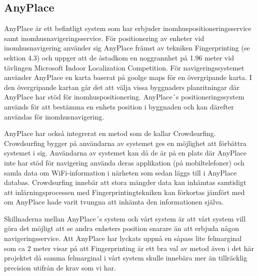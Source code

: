 \documentclass[swedish, a4paper,12pt]{article}
\begin{document}
\subsection{AnyPlace}
AnyPlace är ett befintligt system som har erbjuder inomhuspositioneringsservice samt inomhusnavigeringsservice. För positionering av enheter vid inomhusnavigering använder sig AnyPlace främst av tekniken Fingerprinting (se sektion 4.3) och uppger att de åstadkom en noggrannhet på 1.96 meter vid tävlingen Microsoft Indoor Localization Competition.\cite{anyplace}
\cite{IPS_tavling}
För navigeringssystemet använder AnyPlace en karta baserat på goolge maps för en övergripande karta. I den övergripande kartan går det att välja vissa byggnaders planritningar där AnyPlace har stöd för inomhuspositionering. AnyPlace´s positioneringssystem används för att bestämma en enhets position i byggnaden och kan därefter användas för inomhusnavigering.

AnyPlace har också integrerat en metod som de kallar Crowdsurfing.\cite{anyplace} Crowdsurfing bygger på användarna av systemet ges en möjlighet att förbättra systemet i sig. Användarna av systemet kan då de är på en plats där AnyPlace inte har stöd för navigering använda deras applikation (på mobiltelefoner) och samla data om WiFi-information i närheten som sedan läggs till i AnyPlace databas. Crowdsurfing innebär att stora mängder data kan inhämtas samtidigt att inlärningsprocessen med Fingerprintingtekniken kan förkortas jämfört med om AnyPlace hade varit tvungna att inhämta den informationen själva.

Skillnaderna mellan AnyPlace´s system och vårt system är att vårt system vill göra det möjligt att se andra enheters position snarare än att erbjuda någon navigeringsservice. Att AnyPlace har lyckats uppnå en såpass lite felmarginal som ca 2 meter visar på att Fingerprinting är ett bra val av metod även i det här projektet då samma felmarginal i vårt system skulle innebära mer än tillräcklig precision utifrån de krav som vi har.

\end{document}
